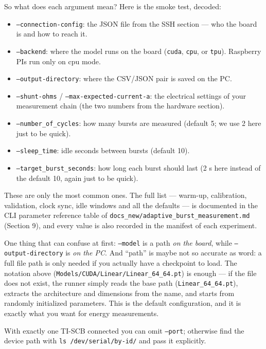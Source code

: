 So what does each argument mean? Here is the smoke test, decoded:

\begin{itemize}
    \item \texttt{--connection-config}: the JSON file from the SSH section
    --- who the board is and how to reach it.
    \item \texttt{--backend}: where the model runs on the board
    (\texttt{cuda}, \texttt{cpu}, or \texttt{tpu}). Raspberry PIs run only on cpu mode.
    \item \texttt{--output-directory}: where the CSV/JSON pair is saved on
    the PC.
    \item \texttt{--shunt-ohms} / \texttt{--max-expected-current-a}: the
    electrical settings of your measurement chain (the two numbers from the
    hardware section).
    \item \texttt{--number\_of\_cycles}: how many bursts are measured
    (default 5; we use 2 here just to be quick).
    \item \texttt{--sleep\_time}: idle seconds between bursts (default 10).
    \item \texttt{--target\_burst\_seconds}: how long each burst should last
    (2 s here instead of the default 10, again just to be quick).
\end{itemize}

These are only the most common ones. The full list --- warm-up, calibration,
validation, clock sync, idle windows and all the defaults --- is documented
in the CLI parameter reference table of
\texttt{docs\_new/adaptive\_burst\_measurement.md} (Section 9), and every
value is also recorded in the manifest of each experiment.

One thing that can confuse at first: \texttt{--model} is a path
\emph{on the board}, while \texttt{--output-directory} is \emph{on the PC}.
And ``path'' is maybe not so accurate as word: a full file path is only needed if
you actually have a checkpoint to load. The notation above
(\texttt{Models/CUDA/}\allowbreak\texttt{Linear/}\allowbreak\texttt{Linear\_64\_64.pt}) is enough --- if the file
does not exist, the runner simply reads the base path (\texttt{Linear\_64\_64.pt}), extracts the
architecture and dimensions from the name, and starts from randomly
initialized parameters. This is the default configuration, and it is exactly
what you want for energy measurements.

With exactly one TI-SCB connected you can omit \texttt{--port}; otherwise
find the device path with \texttt{ls /dev/serial/by-id/} and pass it
explicitly.

